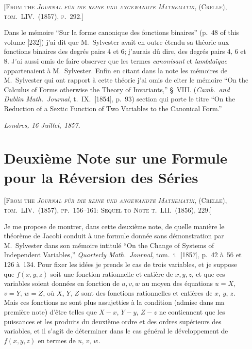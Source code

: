\documentclass[11pt,a4paper]{article}
\begin{document}
\textsc{[From the \textit{Journal f\"ur die reine und angewandte Mathematik}, (Crelle), tom.~LIV.\ (1857), p.~292.]}

\medskip

Dans le m\'emoire ``Sur la forme canonique des fonctions binaires'' (p.~48 of this
volume [232]) j'ai dit que M.~Sylvester avait en outre \'etendu sa th\'eorie aux
fonctions binaires des degr\'es pairs 4 et 6; j'aurais d\^u dire, des degr\'es pairs
4, 6 et 8. J'ai aussi omis de faire observer que les termes \textit{canonisant} et
\textit{lambda\"ique} appartenaient \`a M.~Sylvester. Enfin en citant dans la note les
m\'emoires de M.~Sylvester qui ont rapport \`a cette th\'eorie j'ai omis de citer
le m\'emoire ``On the Calculus of Forms otherwise the Theory of Invariants,'' \S~VIII.
(\textit{Camb.\ and Dublin Math.\ Journal}, t.~IX.\ [1854], p.~93) section qui porte le
titre ``On the Reduction of a Sextic Function of Two Variables to the Canonical
Form.''

\medskip
\noindent\textit{Londres, 16 Juillet, 1857.}

\newpage


\setcounter{page}{54}

\section*{Deuxi\`eme Note sur une Formule pour la R\'eversion des S\'eries}
\label{paper:234}

\textsc{[From the \textit{Journal f\"ur die reine und angewandte Mathematik}, (Crelle), tom.~LIV.\ (1857), pp.~156--161: Sequel to Note t.~LII.\ (1856), 229.]}

\medskip

Je me propose de montrer, dans cette deuxi\`eme note, de quelle mani\`ere le
th\'eor\`eme de Jacobi conduit \`a une formule donn\'ee sans d\'emonstration par
M.~Sylvester dans son m\'emoire intitul\'e ``On the Change of Systems of Independent
Variables,'' \textit{Quarterly Math.\ Journal}, tom.~i.\ [1857], p.~42 \`a~56 et
126 \`a~134. Pour fixer les id\'ees je prends le cas de trois variables, et je
suppose que $f(x,y,z)$ soit une fonction rationnelle et enti\`ere de $x,y,z$, et que
ces variables soient donn\'ees en fonction de $u,v,w$ au moyen des \'equations
$u=X$, $v=Y$, $w=Z$, o\`u $X$, $Y$, $Z$ sont des fonctions rationnelles et
enti\`eres de $x$, $y$, $z$. Mais ces fonctions ne sont plus assujetties \`a la
condition (admise dans ma premi\`ere note) d'\^etre telles que $X-x$, $Y-y$, $Z-z$
ne contiennent que les puissances et les produits du deuxi\`eme ordre et des
ordres sup\'erieurs des variables, et il s'agit de d\'eterminer dans le cas
g\'en\'eral le d\'eveloppement de $f(x,y,z)$ en termes de $u$, $v$, $w$.
\end{document}
